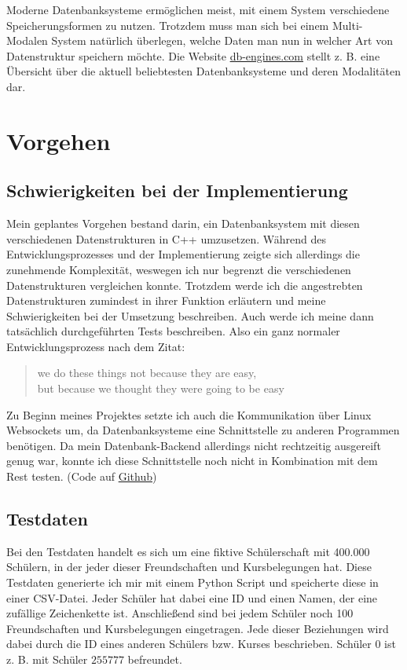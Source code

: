 \documentclass[11pt,a4paper]{article}
\begin{document}
Moderne Datenbanksysteme ermöglichen meist, mit einem System verschiedene
Speicherungsformen zu nutzen. Trotzdem muss man sich bei einem Multi-Modalen System
natürlich überlegen, welche Daten man nun in welcher Art von Datenstruktur speichern
möchte. Die Website \href{https://db-engines.com/en/ranking}{db-engines.com} stellt z. B.
eine Übersicht über die aktuell beliebtesten Datenbanksysteme und deren Modalitäten dar.

\section{Vorgehen}

\subsection{Schwierigkeiten bei der Implementierung}

Mein geplantes Vorgehen bestand darin, ein Datenbanksystem mit diesen
verschiedenen Datenstrukturen in C++ umzusetzen.
Während des Entwicklungsprozesses und der Implementierung zeigte sich allerdings die
zunehmende Komplexität, weswegen ich nur begrenzt die verschiedenen Datenstrukturen
vergleichen konnte. Trotzdem werde ich die angestrebten Datenstrukturen
zumindest in ihrer Funktion erläutern und meine Schwierigkeiten bei der Umsetzung
beschreiben.
Auch werde ich meine dann tatsächlich durchgeführten Tests beschreiben.
Also ein ganz normaler Entwicklungsprozess nach dem Zitat:

\begin{quote}
    \guillemetright we do these things not because they are easy, \\
    \hspace*{0.2em} but because we thought they were going to be easy\guillemetleft
\end{quote}

Zu Beginn meines Projektes setzte ich auch
die Kommunikation über Linux Websockets um, da Datenbanksysteme
eine Schnittstelle zu anderen Programmen benötigen.
Da mein Datenbank-Backend allerdings nicht rechtzeitig ausgereift genug war, konnte
ich diese Schnittstelle noch nicht in Kombination mit dem Rest testen.
(Code auf \href{https://github.com/Redstonerayy/light-db}{Github})

\subsection{Testdaten}

Bei den Testdaten handelt es sich um eine fiktive Schülerschaft mit 400.000 Schülern, in der jeder
dieser Freundschaften und Kursbelegungen hat. Diese Testdaten generierte ich mir
mit einem Python Script und speicherte diese in einer CSV-Datei.
Jeder Schüler hat dabei eine ID und einen Namen, der eine zufällige Zeichenkette ist.
Anschließend sind bei jedem Schüler noch 100 Freundschaften und Kursbelegungen eingetragen.
Jede dieser Beziehungen wird dabei durch die ID eines anderen Schülers bzw. Kurses beschrieben.
Schüler $0$ ist z. B. mit Schüler $255777$ befreundet.
\end{document}
